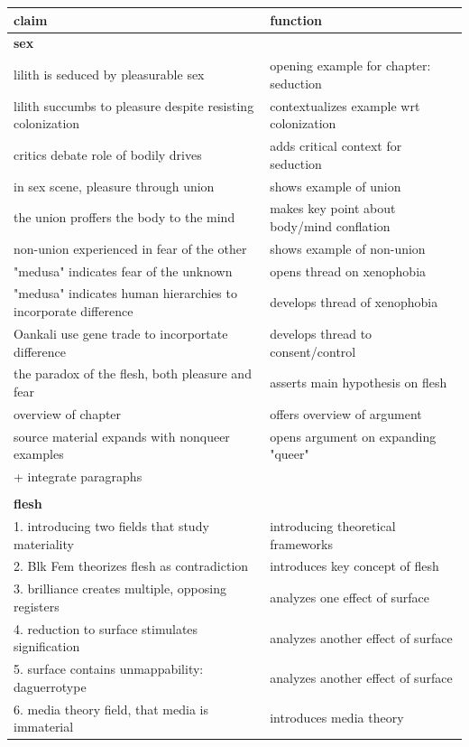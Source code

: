 \documentclass[11pt]{article}
\begin{document}
\begin{center}
\begin{tabular}{ll}
claim & function\\[0pt]
\hline
\textbf{sex} & \\[0pt]
lilith is seduced by pleasurable sex & opening example for chapter: seduction\\[0pt]
lilith succumbs to pleasure despite resisting colonization & contextualizes example wrt colonization\\[0pt]
critics debate role of bodily drives & adds critical context for seduction\\[0pt]
in sex scene, pleasure through union & shows example of union\\[0pt]
the union proffers the body to the mind & makes key point about body/mind conflation\\[0pt]
non-union experienced in fear of the other & shows example of non-union\\[0pt]
"medusa" indicates fear of the unknown & opens thread on xenophobia\\[0pt]
"medusa" indicates human hierarchies to incorporate difference & develops thread of xenophobia\\[0pt]
Oankali use gene trade to incorportate difference & develops thread to consent/control\\[0pt]
the paradox of the flesh, both pleasure and fear & asserts main hypothesis on flesh\\[0pt]
overview of chapter & offers overview of argument\\[0pt]
source material expands with nonqueer examples & opens argument on expanding "queer"\\[0pt]
+ integrate paragraphs & \\[0pt]
 & \\[0pt]
\textbf{flesh} & \\[0pt]
1. introducing two fields that study materiality & introducing theoretical frameworks\\[0pt]
2. Blk Fem theorizes flesh as contradiction & introduces key concept of flesh\\[0pt]
3. brilliance creates multiple, opposing registers & analyzes one effect of surface\\[0pt]
4. reduction to surface stimulates signification & analyzes another effect of surface\\[0pt]
5. surface contains unmappability: daguerrotype & analyzes another effect of surface\\[0pt]
6. media theory field, that media is immaterial & introduces media theory\\[0pt]

\end{tabular}
\end{center}
\end{document}
